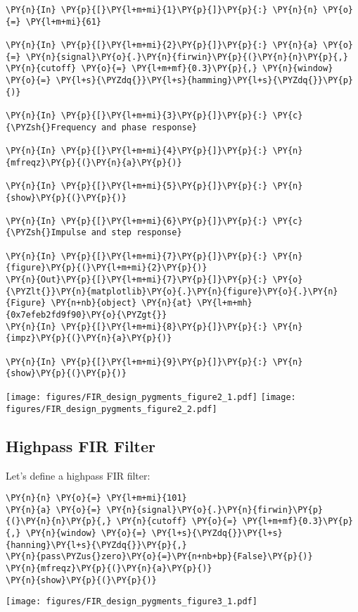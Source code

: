 \documentclass[a4paper,11pt,final]{article}
\begin{document}
\begin{Verbatim}[commandchars=\\\{\},frame=single,fontsize=\small, xleftmargin=0.5em]
\PY{n}{In} \PY{p}{[}\PY{l+m+mi}{1}\PY{p}{]}\PY{p}{:} \PY{n}{n} \PY{o}{=} \PY{l+m+mi}{61}

\PY{n}{In} \PY{p}{[}\PY{l+m+mi}{2}\PY{p}{]}\PY{p}{:} \PY{n}{a} \PY{o}{=} \PY{n}{signal}\PY{o}{.}\PY{n}{firwin}\PY{p}{(}\PY{n}{n}\PY{p}{,} \PY{n}{cutoff} \PY{o}{=} \PY{l+m+mf}{0.3}\PY{p}{,} \PY{n}{window} \PY{o}{=} \PY{l+s}{\PYZdq{}}\PY{l+s}{hamming}\PY{l+s}{\PYZdq{}}\PY{p}{)}

\PY{n}{In} \PY{p}{[}\PY{l+m+mi}{3}\PY{p}{]}\PY{p}{:} \PY{c}{\PYZsh{}Frequency and phase response}

\PY{n}{In} \PY{p}{[}\PY{l+m+mi}{4}\PY{p}{]}\PY{p}{:} \PY{n}{mfreqz}\PY{p}{(}\PY{n}{a}\PY{p}{)}

\PY{n}{In} \PY{p}{[}\PY{l+m+mi}{5}\PY{p}{]}\PY{p}{:} \PY{n}{show}\PY{p}{(}\PY{p}{)}

\PY{n}{In} \PY{p}{[}\PY{l+m+mi}{6}\PY{p}{]}\PY{p}{:} \PY{c}{\PYZsh{}Impulse and step response}

\PY{n}{In} \PY{p}{[}\PY{l+m+mi}{7}\PY{p}{]}\PY{p}{:} \PY{n}{figure}\PY{p}{(}\PY{l+m+mi}{2}\PY{p}{)}
\PY{n}{Out}\PY{p}{[}\PY{l+m+mi}{7}\PY{p}{]}\PY{p}{:} \PY{o}{\PYZlt{}}\PY{n}{matplotlib}\PY{o}{.}\PY{n}{figure}\PY{o}{.}\PY{n}{Figure} \PY{n+nb}{object} \PY{n}{at} \PY{l+m+mh}{0x7efeb2fd9f90}\PY{o}{\PYZgt{}}
\PY{n}{In} \PY{p}{[}\PY{l+m+mi}{8}\PY{p}{]}\PY{p}{:} \PY{n}{impz}\PY{p}{(}\PY{n}{a}\PY{p}{)}

\PY{n}{In} \PY{p}{[}\PY{l+m+mi}{9}\PY{p}{]}\PY{p}{:} \PY{n}{show}\PY{p}{(}\PY{p}{)}
\end{Verbatim}
\texttt{[image: figures/FIR\_design\_pygments\_figure2\_1.pdf]}
\texttt{[image: figures/FIR\_design\_pygments\_figure2\_2.pdf]}


\subsection{Highpass FIR Filter}

Let's define a highpass FIR filter:


\begin{Verbatim}[commandchars=\\\{\},frame=single,fontsize=\small, xleftmargin=0.5em]
\PY{n}{n} \PY{o}{=} \PY{l+m+mi}{101}
\PY{n}{a} \PY{o}{=} \PY{n}{signal}\PY{o}{.}\PY{n}{firwin}\PY{p}{(}\PY{n}{n}\PY{p}{,} \PY{n}{cutoff} \PY{o}{=} \PY{l+m+mf}{0.3}\PY{p}{,} \PY{n}{window} \PY{o}{=} \PY{l+s}{\PYZdq{}}\PY{l+s}{hanning}\PY{l+s}{\PYZdq{}}\PY{p}{,}
\PY{n}{pass\PYZus{}zero}\PY{o}{=}\PY{n+nb+bp}{False}\PY{p}{)}
\PY{n}{mfreqz}\PY{p}{(}\PY{n}{a}\PY{p}{)}
\PY{n}{show}\PY{p}{(}\PY{p}{)}
\end{Verbatim}
\texttt{[image: figures/FIR\_design\_pygments\_figure3\_1.pdf]}
\end{document}
